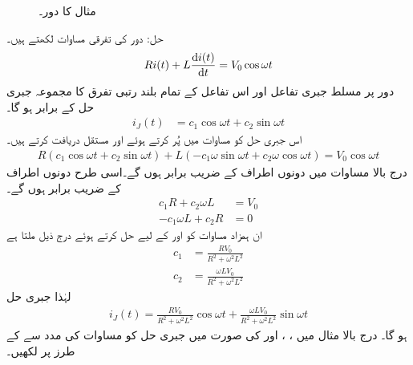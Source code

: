 \begin{figure}
\centering
{}
\caption{مثال  کا دور۔}
\label{شکل_بدلتا_مزاحمت_امالہ_جبری_حل_الف}
\end{figure}

حل: دور کی تفرقی مساوات لکھتے ہیں۔
\begin{align}\label{مساوات_بدلتا_مزاحمت_امالہ_جبری_حل_الف}
R i(t)+L \frac{\dif i(t)}{\dif t}=V_0 \cos \omega t
\end{align}
دور پر مسلط جبری تفاعل اور اس تفاعل کے تمام بلند رتبی تفرق کا مجموعہ جبری حل کے برابر ہو گا۔
\begin{align*}
i_J(t)&=c_1 \cos \omega t+c_2\sin \omega t
\end{align*} 
اس جبری حل کو مساوات  میں پُر کرتے ہوئے  اور  مستقل دریافت کرتے ہیں۔ 
\begin{align*}
R(c_1 \cos \omega t+c_2\sin \omega t)+L (-c_1 \omega \sin\omega t+c_2 \omega \cos \omega t)=V_0 \cos \omega t
\end{align*}
درج بالا مساوات میں دونوں اطراف  کے   ضریب  برابر ہوں گے۔اسی طرح دونوں اطراف  کے  ضریب  برابر ہوں گے۔
\begin{align*}
c_1 R+c_2 \omega L&=V_0\\
-c_1 \omega L+c_2 R&=0
\end{align*}
ان ہمزاد مساوات کو  اور  کے لیے حل کرتے ہوئے درج ذیل ملتا ہے
\begin{align*}
c_1&=\frac{R V_0}{R^2+\omega^2 L^2}\\
c_2&=\frac{\omega L V_0}{R^2+\omega^2 L^2}
\end{align*}
لہٰذا جبری حل
\begin{align}\label{مساوات_بدلتا_جبری_حل_الف}
i_J(t)=\frac{R V_0}{R^2+\omega^2 L^2} \cos \omega t+\frac{\omega L V_0}{R^2+\omega^2 L^2} \sin \omega t
\end{align}
ہو گا۔
درج بالا مثال میں ، ،  اور  کی صورت میں جبری حل کو مساوات  کی مدد سے  کے طرز پر لکھیں۔

